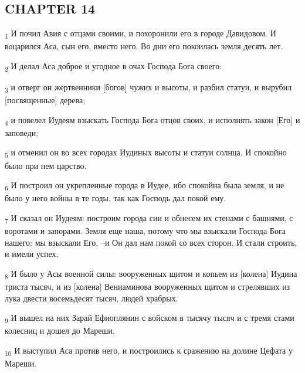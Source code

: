 \subsection{CHAPTER 14}
\begin{tcolorbox}
\textsubscript{1} И почил Авия с отцами своими, и похоронили его в городе Давидовом. И воцарился Аса, сын его, вместо него. Во дни его покоилась земля десять лет.
\end{tcolorbox}
\begin{tcolorbox}
\textsubscript{2} И делал Аса доброе и угодное в очах Господа Бога своего:
\end{tcolorbox}
\begin{tcolorbox}
\textsubscript{3} и отверг он жертвенники [богов] чужих и высоты, и разбил статуи, и вырубил [посвященные] дерева;
\end{tcolorbox}
\begin{tcolorbox}
\textsubscript{4} и повелел Иудеям взыскать Господа Бога отцов своих, и исполнять закон [Его] и заповеди;
\end{tcolorbox}
\begin{tcolorbox}
\textsubscript{5} и отменил он во всех городах Иудиных высоты и статуи солнца. И спокойно было при нем царство.
\end{tcolorbox}
\begin{tcolorbox}
\textsubscript{6} И построил он укрепленные города в Иудее, ибо спокойна была земля, и не было у него войны в те годы, так как Господь дал покой ему.
\end{tcolorbox}
\begin{tcolorbox}
\textsubscript{7} И сказал он Иудеям: построим города сии и обнесем их стенами с башнями, с воротами и запорами. Земля еще наша, потому что мы взыскали Господа Бога нашего: мы взыскали Его, --и Он дал нам покой со всех сторон. И стали строить, и имели успех.
\end{tcolorbox}
\begin{tcolorbox}
\textsubscript{8} И было у Асы военной силы: вооруженных щитом и копьем из [колена] Иудина триста тысяч, и из [колена] Вениаминова вооруженных щитом и стрелявших из лука двести восемьдесят тысяч, людей храбрых.
\end{tcolorbox}
\begin{tcolorbox}
\textsubscript{9} И вышел на них Зарай Ефиоплянин с войском в тысячу тысяч и с тремя стами колесниц и дошел до Мареши.
\end{tcolorbox}
\begin{tcolorbox}
\textsubscript{10} И выступил Аса против него, и построились к сражению на долине Цефата у Мареши.
\end{tcolorbox}
